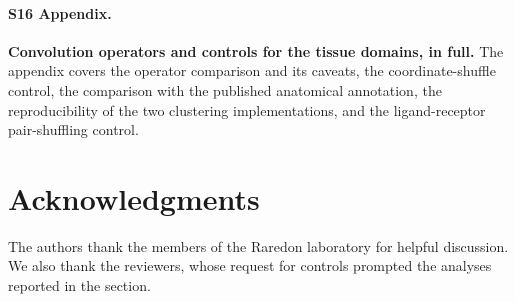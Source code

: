 \documentclass[10pt,letterpaper]{article}
\begin{document}
\paragraph*{S16 Appendix.}
\label{S16_Appendix}
\textbf{Convolution operators and controls for the tissue domains, in full.} The appendix covers the operator comparison and its caveats, the coordinate-shuffle control, the comparison with the published anatomical annotation, the reproducibility of the two clustering implementations, and the ligand-receptor pair-shuffling control.

\section*{Acknowledgments}
The authors thank the members of the Raredon laboratory for helpful discussion. We also
thank the reviewers, whose request for controls prompted the analyses reported in the
 section.

\nolinenumbers


\end{document}

